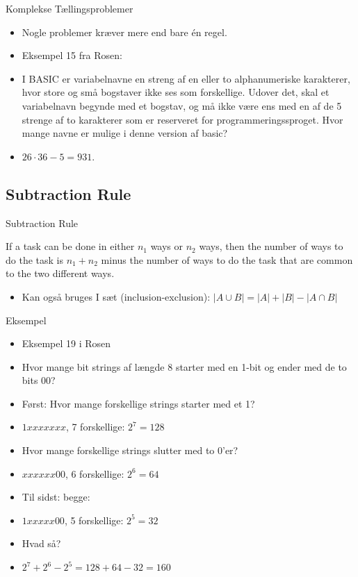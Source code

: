 \documentclass{beamer}
\begin{document}
\begin{frame}{Komplekse Tællingsproblemer}

\begin{itemize}
\item<1-> Nogle problemer kræver mere end bare én regel. 
\item<1-> Eksempel 15 fra Rosen: 
\item<1-> I BASIC er variabelnavne en streng af en eller to alphanumeriske karakterer, hvor store og små bogstaver ikke ses som forskellige. Udover det, skal et variabelnavn begynde med et bogstav, og må ikke være ens med en af de 5 strenge af to karakterer som er reserveret for programmeringssproget. Hvor mange navne er mulige i denne version af basic? 
\item <2-> $26 \cdot 36 - 5 = 931$.
\end{itemize}
    
\end{frame}

\subsection{Subtraction Rule}
\begin{frame}{Subtraction Rule}
\begin{theorem}
    If a task can be done in either $n_1$ ways or $n_2$ ways, then the number of ways to do the task is $n_1 + n_2$ minus the number of ways to do the task that are common to the two different ways.
\end{theorem}
\begin{itemize}
    \item Kan også bruges I sæt (inclusion-exclusion): $|A \cup B| = |A| + |B| - |A \cap B|$
\end{itemize}
    
\end{frame}

\begin{frame}{Eksempel}
   \begin{itemize}
       \item<1-> Eksempel 19 i Rosen
       \item<1-> Hvor mange bit strings af længde 8 starter med en 1-bit og ender med de to bits 00? 
       \item<2-> Først: Hvor mange forskellige strings starter med et 1? 
       \item<3-> $1xxxxxxx$, 7 forskellige: $2^7 = 128$
       \item<4-> Hvor mange forskellige strings slutter med to 0'er? 
       \item<5-> $xxxxxx00$, 6 forskellige: $2^6 = 64$
       \item<6-> Til sidst: begge:
       \item<6-> $1xxxxx00$, 5 forskellige: $2^5 = 32$
       \item<6-> Hvad så? 
       \item<7-> $2^7 + 2^6 - 2^5 = 128 + 64 - 32 = 160$
   \end{itemize} 
\end{frame}
\end{document}
